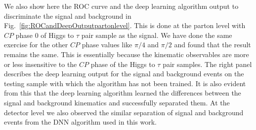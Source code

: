 \documentclass[pdftex,twocolumn,epjc3]{svjour3}          %
\begin{document}
We also show here the ROC curve and the deep learning algorithm output to discriminate the signal and background in Fig.~\ref{fig:ROCandDeepOutputpartonlevel}. This is done at the parton level with $CP$ phase 0 of Higgs to $\tau$ pair sample as the signal. We have done the same exercise for the other $CP$ phase values like $\pi/4$ and $\pi/2$ and found that the result remains the same. This is essentially because the kinematic observables are more or less insensitive to the $CP$ phase of the Higgs to $\tau$ pair samples. The right panel describes the deep learning output for the signal and background events on the testing sample with which the algorithm has not been trained. It is also evident from this that the deep learning algorithm learned the differences between the signal and background kinematics and successfully separated them. At the detector level we also observed the similar separation of signal and background events from the DNN algorithm used in this work.
\end{document}
